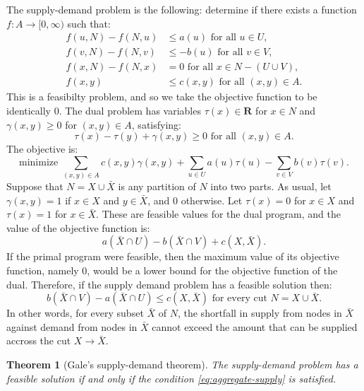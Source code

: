 \documentclass{amsbook}
\newcommand{\RR}{\mathbf R}
\newtheorem{theorem}{Theorem}[section]
\theoremstyle{definition}
\theoremstyle{remark}
\begin{document}
The supply-demand problem is the following: determine if there exists a function $f:A\to [0,\infty)$ such that:
\begin{align}
  \tag{SD1}\label{eq:sd1}f(u,N)-f(N,u) & \leq a(u) \text{ for all }u\in U,\\
  \tag{SD2}\label{eq:sd2}f(v,N)-f(N,v) & \leq -b(u) \text{ for all }v\in V,\\
  \tag{SD3}\label{eq:sd3}f(x,N)-f(N,x) & = 0 \text{ for all }x\in N-(U\cup V),\\
  \tag{SD4}\label{eq:sd4}f(x,y) & \leq c(x,y) \text{ for all } (x,y)\in A.
\end{align}
This is a feasibilty problem, and so we take the objective function to be identically $0$.
The dual problem has variables $\tau(x)\in \RR$ for $x\in N$ and $\gamma(x,y)\geq 0$ for $(x,y)\in A$, satisfying:
\begin{displaymath}
  \tau(x)-\tau(y)+\gamma(x,y)\geq 0 \text{ for all } (x,y)\in A.
\end{displaymath}
The objective is:
\begin{displaymath}
  \text{minimize } \sum_{(x,y)\in A} c(x,y)\gamma(x,y)+\sum_{u\in U}a(u)\tau(u)-\sum_{v\in V}b(v)\tau(v).
\end{displaymath}
Suppose that $N=X\cup \bar X$ is any partition of $N$ into two parts.
As usual, let $\gamma(x,y)=1$ if $x\in X$ and $y\in \bar X$, and $0$ otherwise.
Let $\tau(x)=0$ for $x\in X$ and $\tau(x)=1$ for $x\in \bar X$.
These are feasible values for the dual program, and the value of the objective function is:
\begin{displaymath}
  a(\bar X\cap U) - b(\bar X\cap V) + c(X,\bar X). 
\end{displaymath}
If the primal program were feasible, then the maximum value of its objective function, namely $0$, would be a lower bound for the objective function of the dual.
Therefore, if the supply demand problem has a feasible solution then:
\begin{equation}
  \label{eq:aggregate-supply}
  b(\bar X\cap V) - a(\bar X\cap U) \leq c(X,\bar X) \text{ for every cut } N=X\cup \bar X.
\end{equation}
In other words, for every subset $\bar X$ of $N$, the shortfall in supply from nodes in $\bar X$ against demand from nodes in $\bar X$ cannot exceed the amount that can be supplied accross the cut $X\to \bar X$.
\begin{theorem}
  [Gale's supply-demand theorem]
  \label{theorem:supply-demand}
  The supply-demand problem has a feasible solution if and only if the condition \eqref{eq:aggregate-supply} is satisfied.
\end{theorem}
\end{document}
